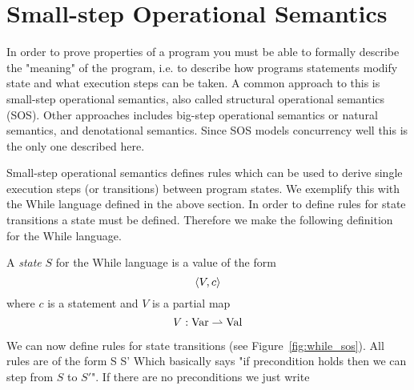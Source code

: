 \section{Small-step Operational Semantics} \label{sec:language_semantics}

In order to prove properties of a program you must be able to formally describe
the "meaning" of the program, i.e. to describe how programs statements modify
state and what execution steps can be taken. A common approach to this is
small-step operational semantics, also called structural operational semantics
(SOS). Other approaches includes big-step operational semantics or natural
semantics, and denotational semantics. Since SOS models concurrency well this is
the only one described here.

Small-step operational semantics defines rules which can be used to derive
single execution steps (or transitions) between program states. We exemplify
this with the While language defined in the above section. In order to define
rules for state transitions a state must be defined. Therefore we make the
following definition for the While language.

\begin{definition}
  A \emph{state} $S$ for the While language is a value of the form
  \begin{equation*}
    \langle V, c \rangle  
  \end{equation*}
  where $c$ is a statement and $V$ is a partial map
  \begin{equation*}
    V: \mbox{$\mathrm{Var}$} \rightharpoonup \mbox{$\mathrm{Val}$}
  \end{equation*}
\end{definition}

We can now define rules for state transitions (see Figure~\ref{fig:while_sos}).
All rules are of the form
{S \rightarrow S'}
Which basically says "if precondition holds then we can step from $S$
to $S'$".  If there are no preconditions we just write


